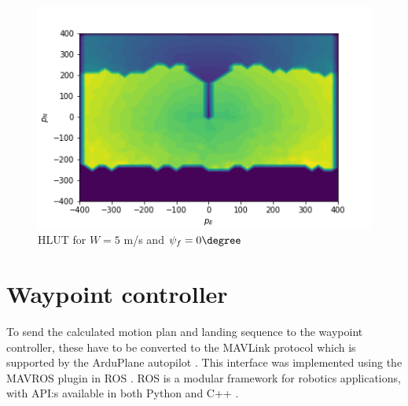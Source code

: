 \begin{figure}
    \begin{center}
        \includegraphics[width=.6\linewidth]{hlut}
    \end{center}
    \caption{HLUT for $W=5$ m/s and $\psi_f=0\degree$}
    \label{fig:hlut}
\end{figure}

\section{Waypoint controller}
To send the calculated motion plan and landing sequence to the waypoint controller, these have to be converted to the 
MAVLink protocol which is supported by the ArduPlane autopilot \cite{mavlink}. This interface was implemented using the MAVROS 
plugin in ROS \cite{mavros}. ROS is a modular framework for robotics applications, with API:s available in both Python and C++ \cite{ros}.
